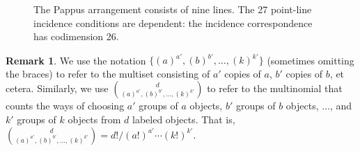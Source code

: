 \documentclass[12pt]{article}
\theoremstyle{plain}
\theoremstyle{definition}
\newtheorem{remark}[theorem]{Remark}
\begin{document}
\begin{figure}[h!t]
\begin{center}
\end{center}
\caption{The Pappus arrangement consists of nine lines. The 27
  point-line incidence conditions are dependent: the incidence
  correspondence has codimension 26.}
\label{figpappus}
\end{figure}

\begin{remark} \label{notation} We use the notation $\{(a)^{a'},(b)^{b'}, \ldots,
  (k)^{k'}\}$ (sometimes omitting the braces) to refer to the multiset
  consisting of $a'$ copies of $a$, $b'$ copies of $b$, et
  cetera. Similarly, we use $\binom{d}{(a)^{a'},(b)^{b'}, \ldots,
  (k)^{k'}}$ to refer to the multinomial that counts the ways of choosing $a'$ groups of
$a$ objects, $b'$ groups of $b$ objects, $\ldots$, and $k'$ groups of
$k$ objects from $d$ labeled objects. That is, $\binom{d}{(a)^{a'},(b)^{b'}, \ldots,
  (k)^{k'}} = d!/(a!)^{a'} \cdots (k!)^{k'}$. \end{remark}
\end{document}

